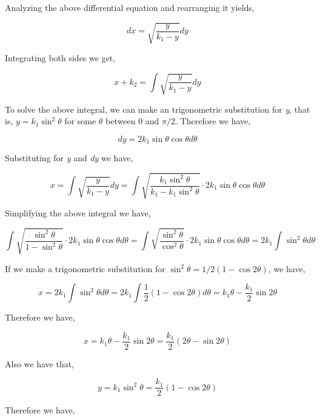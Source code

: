 	{Analyzing the above differential equation and rearranging it yields,}

		$$dx = \sqrt{\frac{y}{k_{1} - y}}dy$$

	{Integrating both sides we get,}

		$$x + k_{2} = \int\sqrt{\frac{y}{k_{1} - y}}dy$$

	{To solve the above integral, we can make an trigonometric substitution for \textit{y}, that is, $y = k_{1}\sin^2\theta$ for some $\theta$ between $0$ and $\pi/2$. Therefore we have,}

		$$dy = 2k_{1}\sin\theta\cos\theta d\theta$$

	{Substituting for \textit{y} and \textit{dy} we have,}


		$$x = \int\sqrt{\frac{y}{k_{1} - y}}dy = \int\sqrt{\frac{k_{1}\sin^2\theta}{k_{1} - k_{1}\sin^2\theta}}\cdot 2k_{1}\sin\theta\cos\theta d\theta$$

	{Simplifying the above integral we have,}

		$$\int\sqrt{\frac{\sin^2\theta}{1 - \sin^2\theta}}\cdot 2k_{1}\sin\theta\cos\theta d\theta = \int\sqrt{\frac{\sin^2\theta}{\cos^2\theta}}\cdot 2k_{1}\sin\theta\cos\theta d\theta = 2k_{1}\int\sin^2\theta d\theta$$

	{If we make a trigonometric substitution for $\sin^2\theta = 1/2\left(1 - \cos2\theta\right)$, we have,}


		$$x = 2k_{1}\int\sin^2\theta d\theta = 2k_{1}\int\frac{1}{2}\left(1 - \cos2\theta\right) d\theta = k_{1}\theta - \frac{k_{1}}{2}\sin2\theta$$

	{Therefore we have,}


		$$x = k_{1}\theta - \frac{k_{1}}{2}\sin2\theta = \frac{k_{1}}{2}\left(2\theta - \sin2\theta\right)$$

	{Also we have that,}

		$$y = k_{1}\sin^2\theta = \frac{k_{1}}{2}\left(1 - \cos2\theta\right)$$


	{Therefore we have,}


